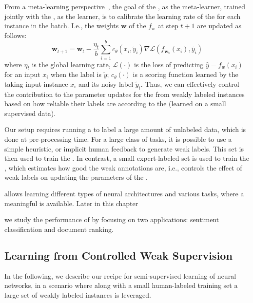 From a meta-learning perspective~\citep{Andrychowicz:2016,Finn2017:ICML,Ravi:2016}, the goal of the \cnet, as the meta-learner, trained jointly with the \tnet, as the learner, is to calibrate the learning rate of the \tnet for each instance in the batch. I.e., the weights $\pmb{w}$ of the \tnet $f_w$ at step $t+1$ are updated as follows:
\begin{equation}
\pmb{w}_{t+1} = \pmb{w}_t - \frac{\eta_t}{b}\sum_{i=1}^b c_{\theta}(x_i, \tilde{y}_i)  \nabla \mathcal{L}(f_{\pmb{w_t}}(x_i), \tilde{y_i})
\end{equation}
where $\eta_t$ is the global learning rate, $\mathcal{L}(\cdot)$ is the loss of predicting $\hat{y}=f_w(x_i)$ for an input $x_i$ when the label is $\tilde{y}$; $c_\theta(\cdot)$ is a scoring function learned by the \cnet taking input instance $x_i$ and its noisy label $\tilde{y}_i$. Thus, we can effectively control the contribution to the parameter updates for the \tnet from weakly labeled instances based on how reliable their labels are according to the \cnet (learned on a small supervised data).

Our setup requires running a \wa to label a large amount of unlabeled data, which is done at pre-processing time. For a large class of tasks, it is possible to use a simple heuristic, or implicit human feedback to generate weak labels. This set is then used to train the \tnet.  
In contrast, a small expert-labeled set is used to train the \cnet, which estimates how good the weak annotations are, i.e., controls the effect of weak labels on updating the parameters of the \tnet.

\cws allows learning different types of neural architectures and various tasks, where a meaningful \wa is available. 
Later in this chapter 

we study the performance of \cws by focusing on two applications: sentiment classification and document ranking. 

\subsection{Learning from Controlled Weak Supervision}
\label{sec:method}
In the following, we describe our recipe for semi-\:supervised learning of neural networks, in a scenario where along with a small human-labeled training set a large set of weakly labeled instances is leveraged.

